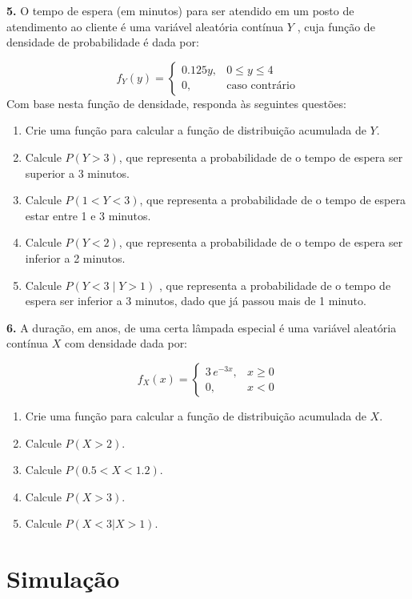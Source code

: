 \documentclass[
]{book}
\begin{document}
\textbf{5.} O tempo de espera (em minutos) para ser atendido em um posto de atendimento ao cliente é uma variável aleatória contínua \(Y\) , cuja função de densidade de probabilidade é dada por:

\[
f_{Y}(y) = 
\begin{cases} 
0.125y, & 0\leq y\leq 4 \\[10pt]
0,& \text{caso contrário}
\end{cases}
\]
Com base nesta função de densidade, responda às seguintes questões:

\begin{enumerate}
\def\labelenumi{(\alph{enumi})}
\item
  Crie uma função para calcular a função de distribuição acumulada de \(Y\).
\item
  Calcule \(P(Y > 3)\), que representa a probabilidade de o tempo de espera ser superior a 3 minutos.
\item
  Calcule \(P(1 < Y < 3)\), que representa a probabilidade de o tempo de espera estar entre 1 e 3 minutos.
\item
  Calcule \(P(Y < 2)\), que representa a probabilidade de o tempo de espera ser inferior a 2 minutos.
\item
  Calcule \(P(Y < 3 \mid Y > 1)\) , que representa a probabilidade de o tempo de espera ser inferior a 3 minutos, dado que já passou mais de 1 minuto.
\end{enumerate}

\textbf{6.} A duração, em anos, de uma certa lâmpada especial é uma variável aleatória contínua \(X\) com densidade dada por:

\[
f_{X}(x) = 
\begin{cases} 
3\,e^{-3x}, & x\geq0 \\[10pt]
0,& x<0
\end{cases}
\]

\begin{enumerate}
\def\labelenumi{(\alph{enumi})}
\item
  Crie uma função para calcular a função de distribuição acumulada de \(X\).
\item
  Calcule \(P(X>2)\).
\item
  Calcule \(P(0.5 < X <1.2)\).
\item
  Calcule \(P(X>3)\).
\item
  Calcule \(P(X<3 | X>1)\).
\end{enumerate}

\chapter{Simulação}\label{simulauxe7uxe3o}
\end{document}
